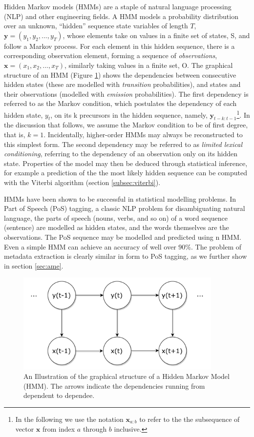 Hidden Markov models (HMMs) are a staple of natural language processing (NLP) and other engineering fields. A HMM models a probability distribution over an unknown, ``hidden'' sequence state variables of length $T$, $\mathbf{y} = (y_1, y_2, ..., y_T)$, whose elements take on values in a finite set of states, S, and follow a Markov process. For each element in this hidden sequence, there is a corresponding observation element, forming a sequence of \emph{observations}, $\mathbf{x} = (x_1, x_2, ..., x_T)$, similarly taking values in a finite set, O. The graphical structure of an HMM (Figure \ref{fig:HMM}) shows the dependencies between consecutive hidden states (these are modelled with \emph{transition} probabilities), and states and their observations (modelled with \emph{emission} probabilities). The first dependency is referred to as the Markov condition, which postulates the dependency of each hidden state, $y_t$, on its k precursors in the hidden sequence, namely, $\mathbf{y}_{t-k:t-1}$\footnote{In the following we use the notation $\mathbf{x}_{a:b}$ to refer to the the subsequence of vector $\mathbf{x}$ from index $a$ through $b$ inclusive.}. In the discussion that follows, we assume the Markov condition to be of first degree, that is, $k =1$. Incidentally, higher-order HMMs may always be reconstructed to this simplest form\cite{reference}. The second dependency may be referred to as \emph{limited lexical conditioning}, referring to the dependency of an observation only on its hidden state. Properties of the model may then be deduced through statistical inference, for example a prediction of the the most likely hidden sequence can be computed with the Viterbi algorithm (section \ref{subsec:viterbi}).

HMMs have been shown to be successful in statistical modelling problems. In Part of Speech (PoS) tagging, a classic NLP problem for disambiguating natural language, the parts of speech (nouns, verbs, and so on) of a word sequence (sentence) are modelled as hidden states, and the words themselves are the observations. The PoS sequence may be modelled and predicted using n HMM. Even a simple HMM can achieve an accuracy of well over $90\%$. The problem of metadata extraction is clearly similar in form to PoS tagging, as we further show in section \ref{sec:ame}.

\begin{figure}[!ht]
\center
\includegraphics[width=4in]{Figures/HMM.pdf}
\caption{An Illustration of the graphical structure of a Hidden Markov Model (HMM). The arrows indicate the dependencies running from dependent to dependee.}
\label{fig:HMM}
\end{figure}


